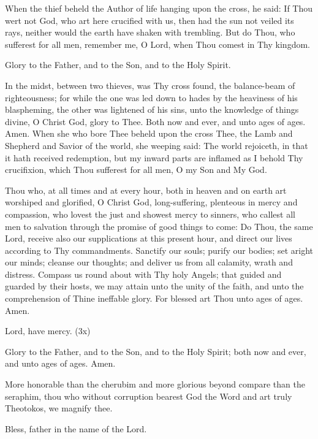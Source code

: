 {\begin{maybetwocolumns}

When the thief beheld the Author of life hanging upon the cross, he said:
If Thou wert not God, who art here crucified with us,
then had the sun not veiled its rays,
neither would the earth have shaken with trembling.
But do Thou, who sufferest for all men, remember me,
O Lord, when Thou comest in Thy kingdom.

Glory to the Father, and to the Son, and to the Holy Spirit.

In the midst, between two thieves, was Thy cross found, the balance-beam of
righteousness; for while the one was led down to hades by the heaviness of his
blaspheming, the other was lightened of his sins,
unto the knowledge of things divine, O Christ God, glory to Thee.
Both now and ever, and unto ages of ages. Amen.
When she who bore Thee beheld upon the cross Thee, the Lamb and Shepherd and Savior
of the world, she weeping said: The world rejoiceth, in that it hath received redemption,
but my inward parts are inflamed as I behold Thy crucifixion, which Thou sufferest for all
men, O my Son and My God.


Thou who, at all times and at every hour, both in heaven and on earth art
worshiped and glorified, O Christ God, long-suffering, plenteous in mercy
and compassion, who lovest the just and showest mercy to sinners, who callest
all men to salvation through the promise of good things to come: Do Thou, the
same Lord, receive also our supplications at this present hour, and direct our
lives according to Thy commandments. Sanctify our souls; purify our bodies;
set aright our minds; cleanse our thoughts; and deliver us from all calamity,
wrath and distress. Compass us round about with Thy holy Angels; that
guided and guarded by their hosts, we may attain unto the unity of the faith,
and unto the comprehension of Thine ineffable glory. For blessed art Thou unto
ages of ages. Amen.
\end{maybetwocolumns}

\begin{reader}
\item Lord, have mercy. (3x)
\item Glory to the Father, and to the Son, and to the Holy Spirit;
  both now and ever, and unto ages of ages. Amen.
\item More honorable than the cherubim and more glorious beyond compare than
  the seraphim, thou who without corruption bearest God the Word and art truly
  Theotokos, we magnify thee.
\item Bless, father in the name of the Lord.
\end{reader}

}
